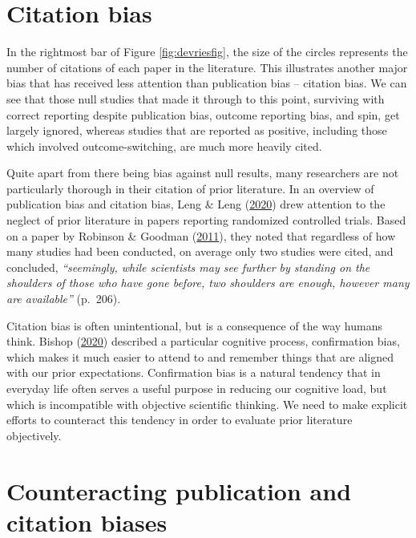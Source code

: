 \documentclass{krantz}
\begin{document}
\hypertarget{citation-bias}{%
\section{Citation bias}\label{citation-bias}}

In the rightmost bar of Figure \ref{fig:devriesfig}, the size of the circles represents the number of citations of each paper in the literature. This illustrates another major bias that has received less attention than publication bias -- citation bias. We can see that those null studies that made it through to this point, surviving with correct reporting despite publication bias, outcome reporting bias, and spin, get largely ignored, whereas studies that are reported as positive, including those which involved outcome-switching, are much more heavily cited.

Quite apart from there being bias against null results, many researchers are not particularly thorough in their citation of prior literature. In an overview of publication bias and citation bias, Leng \& Leng (\protect\hyperlink{ref-leng2020}{2020}) drew attention to the neglect of prior literature in papers reporting randomized controlled trials. Based on a paper by Robinson \& Goodman (\protect\hyperlink{ref-robinson2011}{2011}), they noted that regardless of how many studies had been conducted, on average only two studies were cited, and concluded, \emph{``seemingly, while scientists may see further by standing on the shoulders of those who have gone before, two shoulders are enough, however many are available''} (p.~206).

Citation bias is often unintentional, but is a consequence of the way humans think. Bishop (\protect\hyperlink{ref-bishop2020}{2020}) described a particular cognitive process, confirmation bias, which makes it much easier to attend to and remember things that are aligned with our prior expectations. Confirmation bias is a natural tendency that in everyday life often serves a useful purpose in reducing our cognitive load, but which is incompatible with objective scientific thinking. We need to make explicit efforts to counteract this tendency in order to evaluate prior literature objectively.

\hypertarget{counteracting-publication-and-citation-biases}{%
\section{Counteracting publication and citation biases}\label{counteracting-publication-and-citation-biases}}
\end{document}
